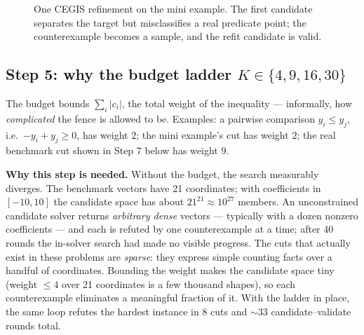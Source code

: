 \documentclass[11pt]{article}
\newcommand{\why}[1]{\begin{whybox}\textbf{Why this step is needed.} #1\end{whybox}}
\begin{document}
\begin{figure}[h]
\centering
{}
\hspace{8mm}
\caption{One CEGIS refinement on the mini example. The first candidate
separates the target but misclassifies a real predicate point; the
counterexample becomes a sample, and the refit candidate is valid.}
\label{fig:cegis}
\end{figure}

\subsection{Step 5: why the budget ladder $K \in \{4, 9, 16, 30\}$}

The budget bounds $\sum_i |c_i|$, the total weight of the inequality ---
informally, how \emph{complicated} the fence is allowed to be. Examples:
a pairwise comparison $y_i \le y_j$, i.e.\ $-y_i + y_j \ge 0$, has weight
$2$; the mini example's cut has weight $2$; the real benchmark cut shown
in Step 7 below has weight $9$.

\why{Without the budget, the search measurably diverges. The benchmark
vectors have 21 coordinates; with coefficients in $[-10,10]$ the
candidate space has about $21^{21} \approx 10^{27}$ members. An
unconstrained candidate solver returns \emph{arbitrary dense} vectors ---
typically with a dozen nonzero coefficients --- and each is refuted by
one counterexample at a time; after 40 rounds the in-solver search had
made no visible progress. The cuts that actually exist in these problems
are \emph{sparse}: they express simple counting facts over a handful of
coordinates. Bounding the weight makes the candidate space tiny
(weight $\le 4$ over 21 coordinates is a few thousand shapes), so each
counterexample eliminates a meaningful fraction of it. With the ladder in
place, the same loop refutes the hardest instance in 8 cuts and
${\sim}33$ candidate--validate rounds total.}
\end{document}
